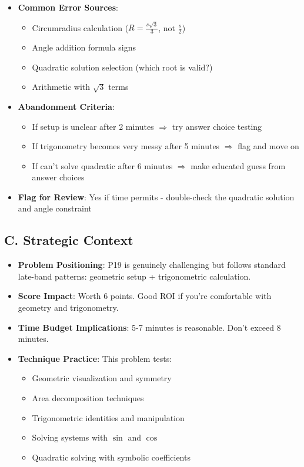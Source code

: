 \documentclass[12pt]{article}
\begin{document}
\begin{competitionbox}
\begin{itemize}[leftmargin=*]
    \item \textbf{Common Error Sources}:
    \begin{itemize}
        \item Circumradius calculation ($R = \frac{s\sqrt{3}}{3}$, not $\frac{s}{2}$)
        \item Angle addition formula signs
        \item Quadratic solution selection (which root is valid?)
        \item Arithmetic with $\sqrt{3}$ terms
    \end{itemize}
    
    \item \textbf{Abandonment Criteria}: 
    \begin{itemize}
        \item If setup is unclear after 2 minutes $\Rightarrow$ try answer choice testing
        \item If trigonometry becomes very messy after 5 minutes $\Rightarrow$ flag and move on
        \item If can't solve quadratic after 6 minutes $\Rightarrow$ make educated guess from answer choices
    \end{itemize}
    
    \item \textbf{Flag for Review}: Yes if time permits - double-check the quadratic solution and angle constraint
\end{itemize}

\subsection*{C. Strategic Context}
\begin{itemize}[leftmargin=*]
    \item \textbf{Problem Positioning}: P19 is genuinely challenging but follows standard late-band patterns: geometric setup + trigonometric calculation.
    
    \item \textbf{Score Impact}: Worth 6 points. Good ROI if you're comfortable with geometry and trigonometry.
    
    \item \textbf{Time Budget Implications}: 5-7 minutes is reasonable. Don't exceed 8 minutes.
    
    \item \textbf{Technique Practice}: This problem tests:
    \begin{itemize}
        \item Geometric visualization and symmetry
        \item Area decomposition techniques
        \item Trigonometric identities and manipulation
        \item Solving systems with $\sin$ and $\cos$
        \item Quadratic solving with symbolic coefficients
    \end{itemize}
\end{itemize}
\end{competitionbox}
\end{document}
